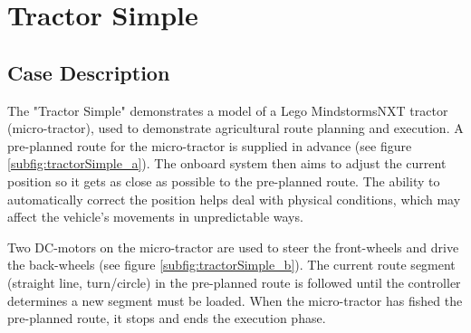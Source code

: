 \chapter{Tractor Simple}\label{chap:tractorsimple}
\section{Case Description}
The "Tractor Simple" demonstrates a model of a Lego\textregistered
Mindstorms\textregistered NXT tractor (micro-tractor), used to
demonstrate agricultural route planning and execution.  A pre-planned
route for the micro-tractor is supplied in advance (see figure
\ref{subfig:tractorSimple_a}).  The onboard system then aims to adjust
the current position so it gets as close as possible to the
pre-planned route.  The ability to automatically correct the position
helps deal with physical conditions, which may affect the vehicle's
movements in unpredictable ways.

\begin{figure}[!ht]
  \centering
  \hspace{1cm}
\end{figure}

Two DC-motors on the micro-tractor are used to steer the front-wheels
and drive the back-wheels (see figure \ref{subfig:tractorSimple_b}).
The current route segment (straight line, turn/circle) in the
pre-planned route is followed until the controller determines a new
segment must be loaded.  When the micro-tractor has fished the
pre-planned route, it stops and ends the execution phase.

